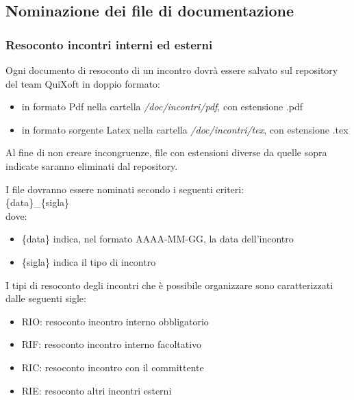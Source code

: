 \documentclass[11pt,a4paper]{article}
\begin{document}
\subsection{Nominazione dei file di documentazione}
\subsubsection{Resoconto incontri interni ed esterni}
Ogni documento di resoconto di un incontro dovrà essere salvato sul repository del team QuiXoft in doppio formato:
\begin{itemize}
	\item in formato Pdf nella cartella \textit{/doc/incontri/pdf}, con estensione .pdf
	\item in formato sorgente Latex nella cartella \textit{/doc/incontri/tex}, con estensione .tex
\end{itemize}
Al fine di non creare incongruenze, file con estensioni diverse da quelle sopra indicate saranno eliminati dal repository.

I file dovranno essere nominati secondo i seguenti criteri: \\

\{data\}\_\{sigla\} \\

dove:

\begin{itemize}
	\item \{data\} indica, nel formato AAAA-MM-GG, la data dell'incontro
	\item \{sigla\} indica il tipo di incontro
\end{itemize}

I tipi di resoconto degli incontri che è possibile organizzare sono caratterizzati dalle seguenti sigle:

\begin{itemize}
	\item RIO: resoconto incontro interno obbligatorio
	\item RIF: resoconto incontro interno facoltativo
	\item RIC: resoconto incontro con il committente
	\item RIE: resoconto altri incontri esterni
\end{itemize}
\end{document}

